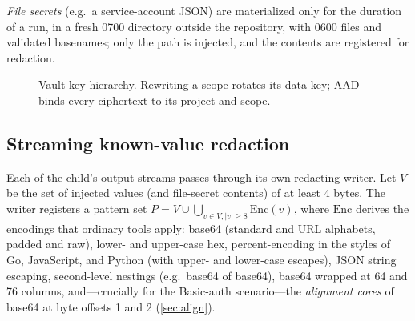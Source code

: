 \documentclass[10pt,twocolumn]{article}
\newcommand{\code}[1]{\textup{\texttt{\detokenize{#1}}}}
\begin{document}
\emph{File secrets} (e.g.\ a service-account JSON) are materialized only for
the duration of a run, in a fresh 0700 directory outside the repository, with
\code{O_EXCL} 0600 files and validated basenames; only the path is injected,
and the contents are registered for redaction.

\begin{figure}[t]
\centering
{}
\caption{Vault key hierarchy. Rewriting a scope rotates its data key; AAD binds
every ciphertext to its project and scope.}
\label{fig:keys}
\end{figure}

\subsection{Streaming known-value redaction}
\label{sec:redact}

Each of the child's output streams passes through its own redacting writer.
Let $V$ be the set of injected values (and file-secret contents) of at least
4 bytes. The writer registers a pattern set
$P = V \cup \bigcup_{v \in V, |v|\geq 8} \mathrm{Enc}(v)$, where $\mathrm{Enc}$
derives the encodings that ordinary tools apply:
base64 (standard and URL alphabets, padded and raw), lower- and upper-case hex,
percent-encoding in the styles of Go, JavaScript, and Python (with
upper- and lower-case escapes), JSON string escaping, second-level nestings
(e.g.\ base64 of base64), base64 wrapped at 64 and 76 columns, and---crucially for
the Basic-auth scenario---the \emph{alignment cores} of base64 at byte offsets
1 and 2 (\cref{sec:align}).
\end{document}
